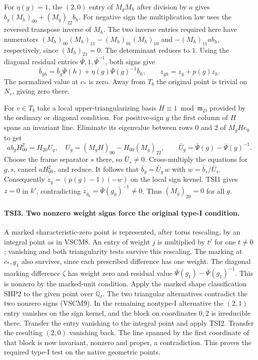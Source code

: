 For $\eta(g)=1$, the $(2,0)$ entry of $M_gM_h$ after division by
$a$ gives $b_g(M_h)_{00}+(M_g)_{22}b_h$. For negative sign the
multiplication law uses the reversed transpose inverse of $M_h$.
The two inverse entries required here have numerators
$(M_h)_{00}(M_h)_{11}-(M_h)_{01}(M_h)_{10}$ and
$-(M_h)_{11}a b_h$, respectively, since $(M_h)_{21}=0$.
The determinant reduces to $1$. Using the diagonal residual entries
$\bar\Psi,1,\bar\Psi^{-1}$, both signs give
\[
 \bar b_{gh}=\bar b_g\bar\Psi(h)
             +\eta(g)\bar\Psi(g)^{-1}\bar b_h,\qquad
 z_{gh}=z_g+p(g)z_h .
\]
The normalized value at $c_*$ is zero. Away from $T_b$ the original
point is trivial on $N_v$, giving zero there.

For $v\in T_b$ take a local upper-triangularizing basis
$H\equiv 1\bmod\mathfrak m_D$ provided by the ordinary or diagonal
condition. For positive-sign $g$ the first column of $H$ spans an
invariant line. Eliminate its eigenvalue between rows $0$ and $2$
of $M_gH e_0$ to get
\[
 a b_g H_{00}^2=H_{20} U_g,\quad
 U_g=(M_gH)_{00}-H_{00}(M_g)_{22},\qquad
 \bar U_g=\bar\Psi(g)-\bar\Psi(g)^{-1}.
\]
Choose the frame separator $s$ there, so $\bar U_s\ne0$.
Cross-multiply the equations for $g,s$, cancel $aH_{00}^2$,
and reduce. It follows that $\bar b_g=\bar U_g\,w$ with
$w=\bar b_s/\bar U_s$. Consequently $z_g=(p(g)-1)(-w)$ on the
local sign kernel. TSI1 gives $z=0$ in $k'$, contradicting
$z_{g_0}=\bar\Psi(g_0)^{-1}\ne0$. Thus $(M_g)_{20}=0$ for all $g$.

\paragraph{TSI3. Two nonzero weight signs force the original type-I condition.}
A marked characteristic-zero point is represented, after torus
rescaling, by an integral point as in VSCM8. An entry of weight $j$
is multiplied by $t^j$ for one $t\ne0$; vanishing and both
triangularity tests survive this rescaling. The marking at $c_*,g_1$
also survives, since each prescribed difference has one weight.
The diagonal marking difference $\zeta$ has weight zero and residual
value $\bar\Psi(g_1)-\bar\Psi(g_1)^{-1}$. This is nonzero
by the marked-unit condition. Apply the marked shape classification SHP2
to the given point over $\overline{\mathbb Q}_\ell$. The two
triangular alternatives contradict the two nonzero signs (VSCM9).
In the remaining nontype-I alternative the $(2,1)$ entry vanishes
on the sign kernel, and the block on coordinates $0,2$ is irreducible
there. Transfer the entry vanishing to the integral point and apply
TSI2. Transfer the resulting $(2,0)$ vanishing back. The line
spanned by the first coordinate of that block is now invariant,
nonzero and proper, a contradiction. This proves the required type-I
test on the native geometric points.

